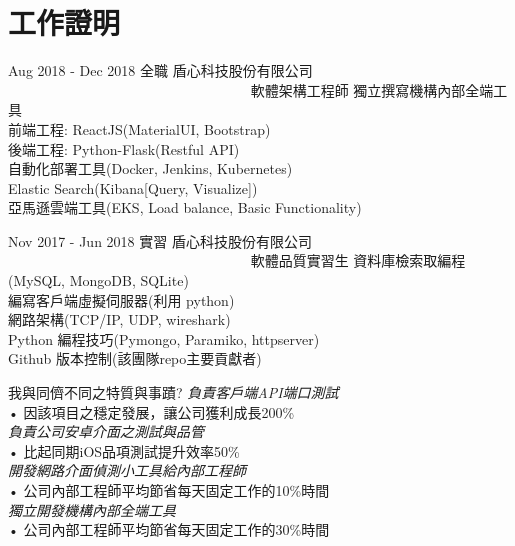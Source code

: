 \documentclass[10pt]{article} %
\begin{document}
\begin{paracol}{2}
\begin{flushleft}
\end{flushleft}
\medskip %


\section{工作證明}

\workposition
	{Aug 2018 - Dec 2018}
	{全職}
	{盾心科技股份有限公司 \ \ \ \ \ \ \ \ \ \ \ \ \ \ \ \ \ \ \ \ \ \ \ \ \ \ \ \ \ \ \ \ \ \ }
	{軟體架構工程師}
	{
		獨立撰寫機構內部全端工具 \\
		前端工程: ReactJS(MaterialUI, Bootstrap) \\
		後端工程: Python-Flask(Restful API) \\
		自動化部署工具(Docker, Jenkins, Kubernetes) \\
		Elastic Search(Kibana[Query, Visualize])\\
		亞馬遜雲端工具(EKS, Load balance, Basic Functionality) } %

\workposition
	{Nov 2017 - Jun 2018}
	{實習}
	{盾心科技股份有限公司 \ \ \ \ \ \ \ \ \ \ \ \ \ \ \ \ \ \ \ \ \ \ \ \ \ \ \ \ \ \ \ \ \ \ }
	{軟體品質實習生}
	{
		資料庫檢索取編程(MySQL, MongoDB, SQLite) \\
		編寫客戶端虛擬伺服器(利用 python) \\
		網路架構(TCP/IP, UDP, wireshark) \\
		Python 編程技巧(Pymongo, Paramiko, httpserver) \\
		Github 版本控制(該團隊repo主要貢獻者)}  %

\longformdescription
{我與同儕不同之特質與事蹟?}
{
	\textit{負責客戶端API端口測試} \\
	• 因該項目之穩定發展，讓公司獲利成長200\% \\
	\textit{負責公司安卓介面之測試與品管} \\
	• 比起同期iOS品項測試提升效率50\% \\
	\textit{開發網路介面偵測小工具給內部工程師} \\
	• 公司內部工程師平均節省每天固定工作的10\%時間\\
	\textit{獨立開發機構內部全端工具} \\
	• 公司內部工程師平均節省每天固定工作的30\%時間
}


\end{paracol}
\end{document}
